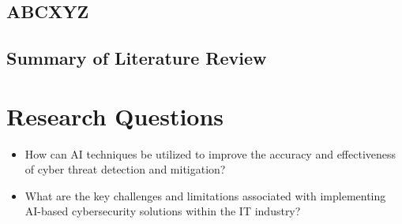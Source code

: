 \documentclass[a4paper,man,12pt]{article}
\begin{document}
  \subsection{ABCXYZ}
  \lipsum[2] %
  \paragraph{}
  \lipsum[2] %

  
  \subsection{Summary of Literature Review}
  \lipsum[2] %
  \paragraph{}
  \lipsum[2] %




\section{Research Questions}

  
  \lipsum[2] %
  
  
  \begin{itemize}
    
    \item How can AI techniques be utilized to improve the accuracy and effectiveness of cyber threat detection and mitigation?
    \item What are the key challenges and limitations associated with implementing AI-based cybersecurity solutions within the IT industry?
  \end{itemize}
\end{document}
